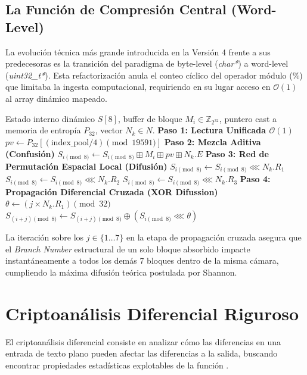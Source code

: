 \documentclass[10pt,journal,compsoc]{IEEEtran}
\begin{document}
\subsection{La Función de Compresión Central (Word-Level)}
La evolución técnica más grande introducida en la Versión 4 frente a sus predecesoras es la transición del paradigma de byte-level (\textit{char*}) a word-level (\textit{uint32\_t*}). Esta refactorización anula el conteo cíclico del operador módulo ($\%$) que limitaba la ingesta computacional, requiriendo en su lugar acceso en $\mathcal{O}(1)$ al array dinámico mapeado.

\begin{algorithm}
\caption{C-Native Word-Level ARX Compression Core}
\begin{algorithmic}[1]
\REQUIRE Estado interno dinámico $S[8]$, buffer de bloque $M_i \in \mathbb{Z}_{2^{32}}$, puntero cast a memoria de entropía $P_{32}$, vector $N_k \in N$.
    \STATE \textbf{Paso 1: Lectura Unificada $\mathcal{O}(1)$}
    \STATE $pv \leftarrow P_{32}[(\text{index\_pool} / 4) \pmod{19591}]$
    \STATE \textbf{Paso 2: Mezcla Aditiva (Confusión)}
    \STATE $S_{i \pmod{8}} \leftarrow S_{i \pmod{8}} \boxplus M_i \boxplus pv \boxplus N_{k}.E$
    \STATE \textbf{Paso 3: Red de Permutación Espacial Local (Difusión)}
    \STATE $S_{i \pmod{8}} \leftarrow S_{i \pmod{8}} \lll N_{k}.R_1$
    \STATE $S_{i \pmod{8}} \leftarrow S_{i \pmod{8}} \lll N_{k}.R_2$
    \STATE $S_{i \pmod{8}} \leftarrow S_{i \pmod{8}} \lll N_{k}.R_3$
    \STATE \textbf{Paso 4: Propagación Diferencial Cruzada (XOR Difussion)}
        \STATE $\theta \leftarrow (j \times N_{k}.R_1) \pmod{32}$
        \STATE $S_{(i+j)\pmod{8}} \leftarrow S_{(i+j)\pmod{8}} \oplus \left( S_{i \pmod{8}} \lll \theta \right)$
    \ENDFOR
\ENDFOR
\end{algorithmic}
\end{algorithm}

La iteración sobre los $j \in \{1 \dots 7\}$ en la etapa de propagación cruzada asegura que el \textit{Branch Number} estructural de un solo bloque absorbido impacte instantáneamente a todos los demás 7 bloques dentro de la misma cámara, cumpliendo la máxima difusión teórica postulada por Shannon.

\section{Criptoanálisis Diferencial Riguroso}

El criptoanálisis diferencial consiste en analizar cómo las diferencias en una entrada de texto plano pueden afectar las diferencias a la salida, buscando encontrar propiedades estadísticas explotables de la función \cite{biham1991differential}.
\end{document}
